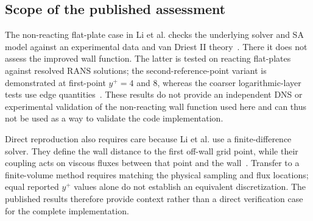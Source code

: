 \subsection{Scope of the published assessment}
\label{subsec:wall-functions:gao-li:published-results}

The non-reacting flat-plate case in Li et al. checks the underlying solver and SA model against an experimental data and van Driest II theory~\cite[Section~IV.B and Figure~2]{li2025WF}. There it does not assess the improved wall function. The latter is tested on reacting flat-plates against resolved RANS solutions; the second-reference-point variant is demonstrated at first-point \(y^+=4\) and \(8\), whereas the coarser logarithmic-layer tests use edge quantities~\cite[Sections~IV.B--C]{li2025WF}. These results do not provide an independent DNS or experimental validation of the non-reacting wall function used here and can thus not be used as a way to validate the code implementation.
\par\medskip

Direct reproduction also requires care because Li et al. use a finite-difference solver. They define the wall distance to the first off-wall grid point, while their coupling acts on viscous fluxes between that point and the wall~\cite[Section~II.A, Eq.~(17) and Figure~16]{li2025WF}. Transfer to a finite-volume method requires matching the physical sampling and flux locations; equal reported \(y^+\) values alone do not establish an equivalent discretization. The published results therefore provide context rather than a direct verification case for the complete implementation.
